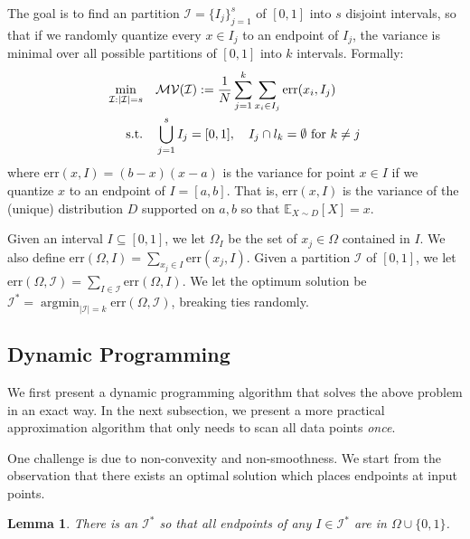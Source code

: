 \documentclass{article}
\def\E{\mathbb{E}}
\newcommand{\err}{\ensuremath{\mathrm{err}}}
\newcommand{\setX}{\Omega}
\newcommand{\setI}{\mathcal{I}}
\DeclareMathOperator*{\argmin}{argmin}
\newtheorem{lemma}{Lemma}
\begin{document}
The goal is to find an partition $\setI = \{I_j\}_{j = 1}^s$ of $[0, 1]$ into $s$ disjoint intervals, so that if we randomly quantize every $x \in I_j$ to an endpoint of $I_j$, the variance is minimal over all possible partitions of $[0, 1]$ into $k$ intervals.
Formally:
\vspace{-0.5em}
\begin{align}
\nonumber \min_{\setI: |\setI| = s} \quad & \mathcal{MV}(\setI) := {1\over N}\sum_{j = 1}^k \sum_{x_i \in I_j} \err(x_i, I_j)\\
\text{s.t.}\quad & \bigcup_{j = 1}^s I_j = [0, 1],\quad I_j\cap l_k = \emptyset~\text{for $k\neq j$}
\label{eq:opt_Q}
\end{align}
where $\err (x, I) = (b - x) (x - a)$ is the variance for point $x \in I$ if we quantize $x$ to an endpoint of $I = [a, b]$.
That is, $\err (x, I)$ is the variance of the (unique) distribution $D$ supported on ${a, b}$  so that $\E_{X \sim D} [X] = x$.

Given an interval $I \subseteq [0, 1]$, we let $\setX_I$ be the set of $x_j \in \setX$ contained in $I$.
We also define $\err (\setX, I) = \sum_{x_j \in I} \err (x_j, I)$.
Given a partition $\setI$ of $[0, 1]$, we let $\err (\setX, \setI) = \sum_{I \in \setI} \err (\setX, I)$.
We let the optimum solution be $\setI^* = \argmin_{|\setI| = k} \err (\setX, \setI)$, breaking ties randomly. 

\vspace{-1em}
\subsection{Dynamic Programming}
\vspace{-0.5em}

We first present a dynamic programming algorithm that solves the above problem in an exact way. In the next subsection, we present a more practical approximation algorithm that only needs to scan all data points \emph{once}.

\vspace{-0.5em}
One challenge is due to non-convexity and non-smoothness. 
We start from the observation that there exists an optimal solution which places endpoints at input points. 

\begin{lemma}
\label{lem:discrete}
There is an $\setI^*$ so that all endpoints of any $I \in \setI^*$ are in $\Omega \cup \{0, 1\}$.
\end{lemma}
\end{document}
